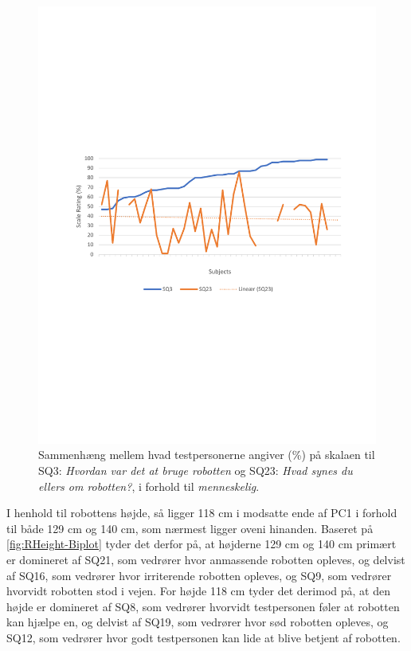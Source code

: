 \begin{figure}[H]
	\centering
	\includegraphics[width=\textwidth]{Figure/Korrelationsgrafer/SQ3+SQ23}
	\caption{Sammenhæng mellem hvad testpersonerne angiver (\%) på skalaen til SQ3: \textit{Hvordan var det at bruge robotten} og SQ23: \textit{Hvad synes du ellers om robotten?}, i forhold til \textit{menneskelig}.}
	\label{fig:SammenligningSQ13SQ23}
\end{figure}
\noindent
%
I henhold til robottens højde, så ligger 118 cm i modsatte ende af PC1 i forhold til både 129 cm og 140 cm, som nærmest ligger oveni hinanden. Baseret på \autoref{fig:RHeight-Biplot} tyder det derfor på, at højderne 129 cm og 140 cm primært er domineret af SQ21, som vedrører hvor anmassende robotten opleves, og delvist af SQ16, som vedrører hvor irriterende robotten opleves, og SQ9, som vedrører hvorvidt robotten stod i vejen. For højde 118 cm tyder det derimod på, at den højde er domineret af SQ8, som vedrører hvorvidt testpersonen føler at robotten kan hjælpe en, og delvist af SQ19, som vedrører hvor sød robotten opleves, og SQ12, som vedrører hvor godt testpersonen kan lide at blive betjent af robotten. 

